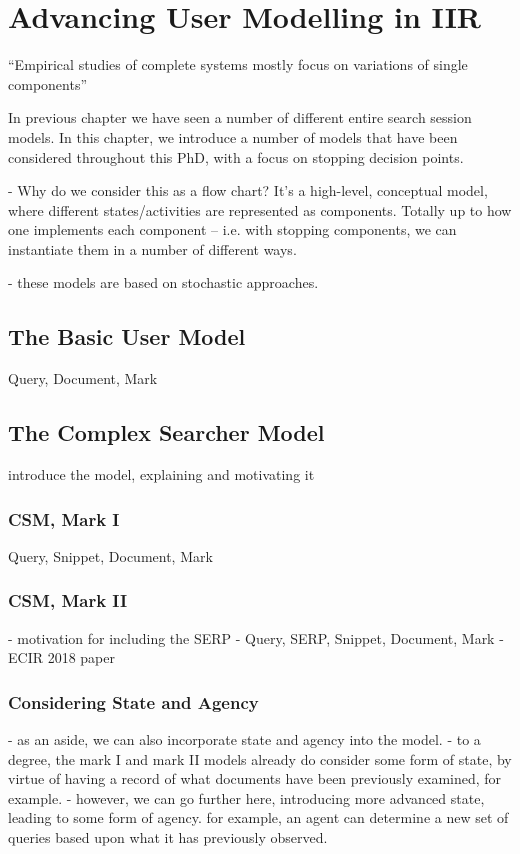 
\chapter[Advancing User Modelling in IIR]{Advancing User Modelling in IIR}

``Empirical studies of complete systems mostly focus on variations of single components''~\citep{fuhr2008iprp}

In previous chapter we have seen a number of different entire search session models.
In this chapter, we introduce a number of models that have been considered throughout this PhD, with a focus on stopping decision points.

- Why do we consider this as a flow chart?
It's a high-level, conceptual model, where different states/activities are represented as components.
Totally up to how one implements each component -- i.e. with stopping components, we can instantiate them in a number of different ways.

- these models are based on stochastic approaches.


\section{The Basic User Model}
Query, Document, Mark

\section{The Complex Searcher Model}
introduce the model, explaining and motivating it

\subsection{CSM, Mark I}
Query, Snippet, Document, Mark

\subsection{CSM, Mark II}
- motivation for including the SERP
- Query, SERP, Snippet, Document, Mark
- ECIR 2018 paper

\subsection{Considering State and Agency}
- as an aside, we can also incorporate state and agency into the model.
- to a degree, the mark I and mark II models already do consider some form of state, by virtue of having a record of what documents have been previously examined, for example.
- however, we can go further here, introducing more advanced state, leading to some form of agency. for example, an agent can determine a new set of queries based upon what it has previously observed.

